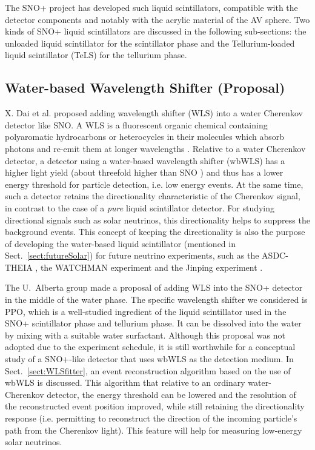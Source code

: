 The SNO+ project has developed such liquid scintillators, compatible with the detector components and notably with the acrylic material of the AV sphere. Two kinds of SNO+ liquid scintillators are discussed in the following sub-sections: the unloaded liquid scintillator for the scintillator phase and the Tellurium-loaded liquid scintillator (TeLS) for the tellurium phase.

\subsection{Water-based Wavelength Shifter (Proposal)}\label{sect:wbWLS}

X. Dai et al. \cite{dai2008wavelength} proposed adding wavelength shifter (WLS) into a water Cherenkov detector like SNO. A WLS is a fluorescent organic chemical containing polyaromatic hydrocarbons or heterocycles in their molecules which absorb photons and re-emit them at longer wavelengths \cite{dai2008wavelength,wavelengthShifterWebsite}. Relative to a water Cherenkov detector, a detector using a water-based wavelength shifter (wbWLS) has a higher light yield (about threefold higher than SNO \cite{dai2008wavelength}) and thus has a lower energy threshold for particle detection, i.e. low energy events. At the same time, such a detector retains the directionality characteristic of the Cherenkov signal, in contrast to the case of a \emph{pure} liquid scintillator detector. For studying directional signals such as solar neutrinos, this directionality helps to suppress the background events. This concept of keeping the directionality is also the purpose of developing the water-based liquid scintillator (mentioned in Sect.~\ref{sect:futureSolar}) for future neutrino experiments, such as the ASDC-THEIA \cite{alonso2014advanced}, the WATCHMAN experiment \cite{askins2015physics} and the Jinping experiment \cite{beacom2017physics}.

The U.~Alberta group made a proposal of adding WLS into the SNO+ detector in the middle of the water phase. The specific wavelength shifter we considered is PPO, which is a well-studied ingredient of the liquid scintillator used in the SNO+ scintillator phase and tellurium phase. It can be dissolved into the water by mixing with a suitable water surfactant. Although this proposal was not adopted due to the experiment schedule, it is still worthwhile for a conceptual study of a SNO+-like detector that uses wbWLS as the detection medium. In Sect.~\ref{sect:WLSfitter}, an event reconstruction algorithm based on the use of wbWLS is discussed. This algorithm that relative to an ordinary water-Cherenkov detector, the energy threshold can be lowered and the resolution of the reconstructed event position improved, while still retaining the directionality response (i.e. permitting to reconstruct the direction of the incoming particle's path from the Cherenkov light). This feature will help for measuring low-energy solar neutrinos.

